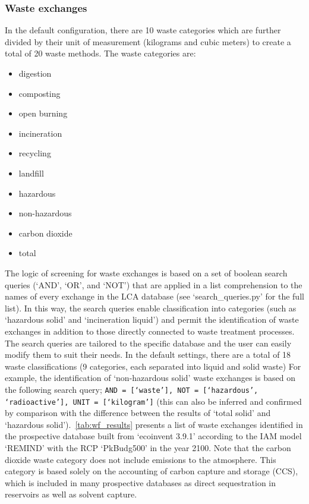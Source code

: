 \subsubsection{Waste exchanges}\label{sec:method-wmf-waste_exchanges}

In the default configuration, there are 10 waste categories which are further divided by their unit of measurement (kilograms and cubic meters) to create a total of 20 waste methods. The waste categories are:
\begin{itemize}[itemsep=0pt]
    \item digestion
    \item composting
    \item open burning
    \item incineration
    \item recycling
    \item landfill
    \item hazardous
    \item non-hazardous
    \item carbon dioxide 
    \item total
\end{itemize}

The logic of screening for waste exchanges is based on a set of boolean search queries (`AND', `OR', and `NOT') that are applied in a list comprehension to the names of every exchange in the LCA database (see `search\_queries.py' for the full list). In this way, the search queries enable classification into categories (such as `hazardous solid' and `incineration liquid') and permit the identification of waste exchanges in addition to those directly connected to waste treatment processes. The search queries are tailored to the specific database and the user can easily modify them to suit their needs. In the default settings, there are a total of 18 waste classifications (9 categories, each separated into liquid and solid waste) For example, the identification of `non-hazardous solid' waste exchanges is based on the following search query; \texttt{AND = [`waste'], NOT = [`hazardous', `radioactive'], UNIT = [`kilogram']} (this can also be inferred and confirmed by comparison with the difference between the results of `total solid' and `hazardous solid').\ \autoref{tab:wf_results} presents a list of waste exchanges identified in the prospective database built from `ecoinvent 3.9.1' according to the IAM model `REMIND' with the RCP `PkBudg500' in the year 2100. Note that the carbon dioxide waste category does not include emissions to the atmosphere. This category is based solely on the accounting of carbon capture and storage (CCS), which is included in many prospective databases as direct sequestration in reservoirs as well as solvent capture.

